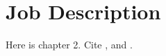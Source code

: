 \chapter{Job Description}\label{ch:job_description}
Here is chapter 2. Cite \cite{Madsen2010}, \cite{Oetiker2010} and \cite{Mittelbach2005}.
